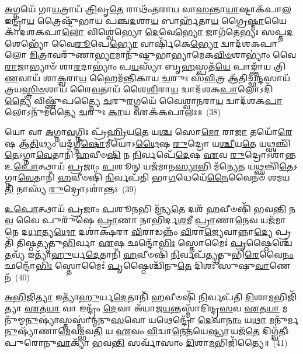 {%
\-\ul{𑌅}\-𑌗𑍍𑌨𑌯𑍇᳴ 𑌗𑌾\-\ul{𑌯}\-𑌤𑍍𑌰𑌾𑌯᳴ \ul{𑌤𑍍𑌰𑌿}\-𑌵𑍃\-\ul{𑌤𑍇} 𑌰𑌾𑌥𑌂᳴𑌤𑌰𑌾𑌯 𑌵𑌾\-\ul{𑌸}\-𑌨𑍍𑌤𑌾\-\ul{𑌯𑌾}\-𑌷𑍍𑌟𑌾𑌕᳴𑌪𑌾\-\ul{𑌲} 𑌇𑌨𑍍𑌦𑍍𑌰𑌾᳴\-\ul{𑌯} 𑌤𑍍𑌰𑍈𑌷𑍍𑌟𑍁᳴𑌭𑌾𑌯 𑌪𑌞𑍍𑌚\-\ul{𑌦}\-𑌶𑌾\-\ul{𑌯} 𑌬𑌾𑌰𑍍\mbox{}𑌹᳴𑌤𑌾\-\ul{𑌯} 𑌗𑍍𑌰𑍈\-\ul{𑌷𑍍𑌮𑌾}\-𑌯𑍈𑌕𑌾᳴\-𑌦𑌶\-𑌕𑌪𑌾\-\ul{𑌲𑍋} 𑌵𑌿𑌶𑍍𑌵𑍇॑𑌭𑍍𑌯𑍋 \ul{𑌦𑍇}\-𑌵𑍇\-\ul{𑌭𑍍𑌯𑍋} 𑌜𑌾𑌗᳴𑌤𑍇𑌭𑍍𑌯𑌃 𑌸𑌪𑍍𑌤\-\ul{𑌦}\-𑌶𑍇𑌭𑍍𑌯𑍋᳴ 𑌵𑍈\-\ul{𑌰𑍂}\-𑌪𑍇\-\ul{𑌭𑍍𑌯𑍋} 𑌵𑌾𑌰𑍍\mbox{}𑌷𑌿᳴𑌕𑍇\-\ul{𑌭𑍍𑌯𑍋} 𑌦𑍍𑌵𑌾𑌦᳴𑌶\-𑌕𑌪𑌾𑌲𑍋 \ul{𑌮𑌿}\-𑌤𑍍𑌰𑌾𑌵𑌰𑍁᳴𑌣𑌾\-\ul{𑌭𑍍𑌯𑌾}\-𑌮𑌾𑌨𑍁᳴𑌷𑍍𑌟𑍁𑌭𑌾𑌭𑍍𑌯𑌾𑌮𑍇𑌕\-\-\ul{𑌵𑌿}\-\-\ul{𑍞}\-𑌶𑌾\-𑌭𑍍𑌯𑌾𑌂॑ 𑌵𑍈\-\ul{𑌰𑌾}\-𑌜𑌾𑌭𑍍𑌯𑌾𑍞᳴ 𑌶𑌾\-\ul{𑌰}\-𑌦𑌾\-𑌭𑍍𑌯𑌾𑌂॑ 𑌪\-\ul{𑌯}\-𑌸𑍍𑌯𑌾᳴ 𑌬𑍃\-\ul{𑌹}\-𑌸𑍍𑌪𑌤᳴\-\ul{𑌯𑍇} 𑌪𑌾𑌙𑍍𑌕𑍍𑌤𑌾᳴𑌯 𑌤𑍍𑌰𑌿\-\ul{𑌣}\-𑌵𑌾𑌯᳴ 𑌶𑌾\-\ul{𑌕𑍍𑌵}\-𑌰𑌾\-\ul{𑌯} 𑌹𑍈𑌮᳴𑌨𑍍𑌤𑌿𑌕𑌾𑌯 \ul{𑌚}\-𑌰𑍁𑌃 𑌸᳴\-\ul{𑌵𑌿}\-𑌤𑍍𑌰 𑌆᳴𑌤𑌿𑌚𑍍𑌛\-\ul{𑌨𑍍𑌦}\-𑌸𑌾𑌯᳴ 𑌤𑍍𑌰𑌯\-\ul{𑌸𑍍𑌤𑍍𑌰𑌿}\-\-\ul{𑍞}\-𑌶𑌾𑌯᳴ 𑌰𑍈\-\ul{𑌵}\-𑌤𑌾𑌯᳴ 𑌶𑍈\-\ul{𑌶𑌿}\-𑌰𑌾\-\ul{𑌯} 𑌦𑍍𑌵𑌾𑌦᳴𑌶\-𑌕\-\ul{𑌪𑌾}\-𑌲𑍋\-𑌽𑌦𑌿᳴\-\ul{𑌤𑍍𑌯𑍈} 𑌵𑌿𑌷𑍍𑌣𑍁᳴𑌪𑌤𑍍𑌨𑍍𑌯𑍈 \ul{𑌚}\-𑌰𑍁\-\ul{𑌰}\-𑌗𑍍𑌨𑌯𑍇᳴ 𑌵𑍈𑌶𑍍𑌵𑌾\-\ul{𑌨}\-𑌰𑌾\-\ul{𑌯} 𑌦𑍍𑌵𑌾𑌦᳴𑌶\-𑌕\-\ul{𑌪𑌾}\-𑌲𑍋\-𑌽𑌨𑍁᳴𑌮𑌤𑍍𑌯𑍈 \ul{𑌚}\-𑌰𑍁𑌃 \ul{𑌕𑌾}\-𑌯 𑌏𑌕᳴𑌕𑌪𑌾𑌲𑌃॥~(38)

{\anuvakamend[{\-\ul{𑌅}\-𑌗𑍍𑌨𑌯𑍇\-𑌽𑌦𑌿᳴\-\ul{𑌤𑍍𑌯𑌾} 𑌅𑌨𑍁᳴𑌮𑌤𑍍𑌯𑍈 \ul{𑌸}\-𑌪𑍍𑌤𑌚᳴𑌤𑍍𑌵𑌾𑌰𑌿𑍞𑌶𑌤𑍍}]}%

𑌯𑍋 𑌵𑌾 \ul{𑌅}\-𑌗𑍍𑌨𑌾\-\ul{𑌵}\-𑌗𑍍𑌨𑌿𑌃 𑌪𑍍𑌰᳴\-\ul{𑌹𑍍𑌰𑌿}\-𑌯\-\ul{𑌤𑍇} 𑌯\-\ul{𑌶𑍍𑌚} 𑌸𑍋\-\ul{𑌮𑍋} 𑌰𑌾\-\ul{𑌜𑌾} 𑌤𑌯𑍋᳴\-\ul{𑌰𑍇}\-𑌷 𑌆᳴\-\ul{𑌤𑌿}\-𑌥𑍍𑌯𑌂 𑌯𑌦᳴𑌗𑍍𑌨𑍀\-\ul{𑌷𑍋}\-𑌮𑍀𑌯𑍋\-𑌽\-\ul{𑌥𑍈}\-𑌷 \ul{𑌰𑍁}\-𑌦𑍍𑌰𑍋 𑌯\-\ul{𑌶𑍍𑌚𑍀}\-𑌯\-\ul{𑌤𑍇} 𑌯𑌥𑍍𑌸𑌞𑍍𑌚𑌿᳴\-\ul{𑌤𑍇}\-\-𑌽𑌗𑍍𑌨𑌾\-\ul{𑌵𑍇}\-𑌤𑌾𑌨𑌿᳴ \ul{𑌹}\-𑌵𑍀𑍞\-\ul{𑌷𑌿} 𑌨 \ul{𑌨𑌿}\-𑌰𑍍𑌵𑌪𑍇᳴\-\ul{𑌦𑍇}\-𑌷 \ul{𑌏}\-𑌵 \ul{𑌰𑍁}\-𑌦𑍍𑌰𑍋\-𑌽𑌶𑌾॑𑌨𑍍𑌤 𑌉\-\ul{𑌪𑍋}\-𑌤𑍍𑌥𑌾𑌯᳴ \ul{𑌪𑍍𑌰}\-𑌜𑌾𑌂 \ul{𑌪}\-𑌶𑍂𑌨𑍍 𑌯𑌜᳴𑌮𑌾𑌨\-\ul{𑌸𑍍𑌯𑌾}\-𑌭𑌿 𑌮᳴𑌨𑍍𑌯𑍇\-\ul{𑌤} 𑌯𑌥𑍍𑌸𑌞𑍍𑌚𑌿᳴\-\ul{𑌤𑍇}\-\-𑌽𑌗𑍍𑌨𑌾\-\ul{𑌵𑍇}\-𑌤𑌾𑌨𑌿᳴ \ul{𑌹}\-𑌵𑍀𑍞𑌷𑌿᳴ \ul{𑌨𑌿}\-𑌰𑍍𑌵𑌪᳴𑌤𑌿 𑌭𑌾\-\ul{𑌗}\-𑌧𑍇𑌯𑍇᳴\-\ul{𑌨𑍈}\-𑌵𑍈𑌨𑍞᳴ 𑌶𑌮𑌯\-\ul{𑌤𑌿} 𑌨𑌾𑌸𑍍𑌯᳴ \ul{𑌰𑍁}\-𑌦𑍍𑌰𑍋\-𑌽𑌶𑌾॑𑌨𑍍𑌤𑌃~(39)

\-\ul{𑌉}\-\-\ul{𑌪𑍋}\-𑌤𑍍𑌥𑌾𑌯᳴ \ul{𑌪𑍍𑌰}\-𑌜𑌾𑌂 \ul{𑌪}\-𑌶𑍂\-\ul{𑌨}\-𑌭𑌿 𑌮᳴𑌨𑍍𑌯\-\ul{𑌤𑍇} 𑌦𑌶᳴ \ul{𑌹}\-𑌵𑍀𑍞𑌷𑌿᳴ 𑌭𑌵\-\ul{𑌨𑍍𑌤𑌿} 𑌨\-\ul{𑌵} 𑌵𑍈 𑌪𑍁𑌰𑍁᳴𑌷𑍇 \ul{𑌪𑍍𑌰𑌾}\-𑌣𑌾 𑌨𑌾𑌭𑌿᳴𑌰𑍍𑌦\-\ul{𑌶}\-𑌮𑍀 \ul{𑌪𑍍𑌰𑌾}\-𑌣𑌾\-\ul{𑌨𑍇}\-𑌵 𑌯𑌜᳴𑌮𑌾𑌨𑍇 𑌦\-\ul{𑌧𑌾}\-𑌤𑍍𑌯\-\ul{𑌥𑍋} 𑌦𑌶𑌾॑𑌕𑍍𑌷𑌰𑌾 \ul{𑌵𑌿}\-𑌰𑌾𑌡𑌨𑍍𑌨𑌂᳴ \ul{𑌵𑌿}\-𑌰𑌾\-\ul{𑌜𑍍𑌯𑍇}\-𑌵𑌾𑌨𑍍𑌨𑌾\-\ul{𑌦𑍍𑌯𑍇} 𑌪𑍍𑌰𑌤𑌿᳴ 𑌤𑌿𑌷𑍍𑌠\-\ul{𑌤𑍍𑌯𑍃}\-𑌤𑍁\-\ul{𑌭𑌿}\-𑌰𑍍𑌵𑌾 \ul{𑌏}\-𑌷 𑌛𑌨𑍍𑌦𑍋᳴\-\ul{𑌭𑌿𑌃} 𑌸𑍍𑌤𑍋𑌮𑍈𑌃॑ \ul{𑌪𑍃}\-𑌷𑍍𑌠𑍈𑌶𑍍𑌚𑍇᳴\-\ul{𑌤}\-𑌵𑍍𑌯᳴ 𑌇𑌤𑍍𑌯𑌾᳴\-\ul{𑌹𑍁}\-𑌰𑍍𑌯\-\ul{𑌦𑍇}\-𑌤𑌾𑌨𑌿᳴ \ul{𑌹}\-𑌵𑍀𑍞𑌷𑌿᳴ \ul{𑌨𑌿}\-𑌰𑍍𑌵𑌪᳴\-\ul{𑌤𑍍𑌯𑍃}\-𑌤𑍁𑌭𑌿᳴\-\ul{𑌰𑍇}\-𑌵𑍈\-\ul{𑌨𑌂} 𑌛𑌨𑍍𑌦𑍋᳴\-\ul{𑌭𑌿𑌃} 𑌸𑍍𑌤𑍋𑌮𑍈𑌃॑ \ul{𑌪𑍃}\-𑌷𑍍𑌠𑍈𑌶𑍍𑌚𑌿᳴𑌨𑍁\-\ul{𑌤𑍇} 𑌦𑌿𑌶𑌃᳴ 𑌸𑍁𑌷𑍁\-\ul{𑌵𑌾}\-𑌣𑍇𑌨᳴~(40)

\-\ul{𑌅}\-\-\ul{𑌭𑌿}\-𑌜𑌿\-\ul{𑌤𑍍𑌯𑌾} 𑌇𑌤𑍍𑌯𑌾᳴\-\ul{𑌹𑍁}\-𑌰𑍍𑌯\-\ul{𑌦𑍇}\-𑌤𑌾𑌨𑌿᳴ \ul{𑌹}\-𑌵𑍀𑍞𑌷𑌿᳴ \ul{𑌨𑌿}\-𑌰𑍍𑌵𑌪᳴𑌤𑌿 \ul{𑌦𑌿}\-𑌶𑌾\-\ul{𑌮}\-𑌭𑌿𑌜𑌿᳴𑌤𑍍𑌯𑌾 \ul{𑌏}\-𑌤\-\ul{𑌯𑌾} 𑌵𑌾 𑌇𑌨𑍍𑌦𑍍𑌰𑌂᳴ \ul{𑌦𑍇}\-𑌵𑌾 𑌅᳴𑌯𑌾𑌜\-\ul{𑌯}\-𑌨𑍍𑌤𑌸𑍍𑌮𑌾᳴𑌦𑌿𑌨𑍍𑌦𑍍𑌰\-\ul{𑌸}\-𑌵 \ul{𑌏}\-𑌤\-\ul{𑌯𑌾} 𑌮𑌨𑍁᳴𑌮𑍍𑌮\-\ul{𑌨𑍁}\-𑌷𑍍𑌯𑌾॑𑌸𑍍𑌤𑌸𑍍𑌮𑌾॑𑌨𑍍𑌮𑌨𑍁\-\ul{𑌸}\-𑌵𑍋 𑌯𑌥𑍇𑌨𑍍𑌦𑍍𑌰𑍋᳴ \ul{𑌦𑍇}\-𑌵𑌾\-\ul{𑌨𑌾𑌂} 𑌯\-\ul{𑌥𑌾} 𑌮𑌨𑍁᳴𑌰𑍍𑌮\-\ul{𑌨𑍁}\-𑌷𑍍𑌯𑌾᳴𑌣𑌾\-\ul{𑌮𑍇}\-𑌵𑌮𑍍𑌭᳴𑌵\-\ul{𑌤𑌿} 𑌯 \ul{𑌏}\-𑌵𑌂 \ul{𑌵𑌿}\-𑌦𑍍𑌵𑌾\-\ul{𑌨𑍇}\-𑌤𑌯𑍇\-\ul{𑌷𑍍𑌟𑍍𑌯𑌾} 𑌯𑌜᳴\-\ul{𑌤𑍇} 𑌦𑌿𑌗𑍍𑌵᳴𑌤𑍀𑌃 𑌪𑍁𑌰𑍋𑌨𑍁\-\ul{𑌵𑌾}\-𑌕𑍍𑌯𑌾᳴ 𑌭𑌵\-\ul{𑌨𑍍𑌤𑌿} 𑌸𑌰𑍍𑌵𑌾᳴𑌸𑌾𑌂 \ul{𑌦𑌿}\-𑌶𑌾\-\ul{𑌮}\-𑌭𑌿𑌜𑌿᳴𑌤𑍍𑌯𑍈॥~(41)

}

